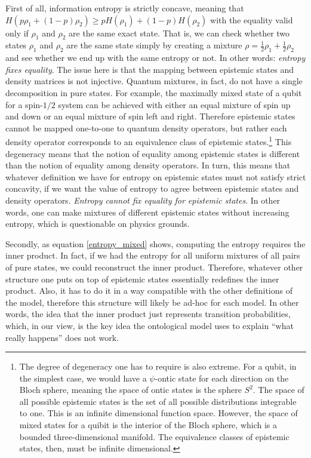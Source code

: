 \documentclass[10pt,twocolumn, nofootinbib]{revtex4-2}
\begin{document}
First of all, information entropy is strictly concave, meaning that $H(p \rho_1 + (1-p) \rho_2) \geq p H(\rho_1) + (1-p) H(\rho_2)$ with the equality valid only if $\rho_1$ and $\rho_2$ are the same exact state. That is, we can check whether two states $\rho_1$ and $\rho_2$ are the same state simply by creating a mixture $\rho = \frac{1}{2} \rho_1 + \frac{1}{2} \rho_2$ and see whether we end up with the same entropy or not. In other words: \emph{entropy fixes equality}. %
The issue here is that the mapping between epistemic states and density matrices is not injective. Quantum mixtures, in fact, do not have a single decomposition in pure states. For example, the maximally mixed state of a qubit for a spin-$1/2$ system can be achieved with either an equal mixture of spin up and down or an equal mixture of spin left and right. Therefore epistemic states cannot be mapped one-to-one to quantum density operators, but rather each density operator corresponds to an equivalence class of epistemic states.\footnote{The degree of degeneracy one has to require is also extreme. For a qubit, in the simplest case, we would have a $\psi$-ontic state for each direction on the Bloch sphere, meaning the space of ontic states is the sphere $S^2$. The space of all possible epistemic states is the set of all possible distributions integrable to one. This is an infinite dimensional function space. However, the space of mixed states for a quibit is the interior of the Bloch sphere, which is a bounded three-dimensional manifold. The equivalence classes of epistemic states, then, must be infinite dimensional.} This degeneracy means that the notion of equality among epistemic states is different than the notion of equality among density operators. In turn, this means that whatever definition we have for entropy on epistemic states must not satisfy strict concavity, if we want the value of entropy to agree between epistemic states and density operators. \emph{Entropy cannot fix equality for epistemic states}. In other words, one can make mixtures of different epistemic states without increasing entropy, which is questionable on physics grounds.

Secondly, as equation \ref{entropy_mixed} shows, computing the entropy requires the inner product. In fact, if we had the entropy for all uniform mixtures of all pairs of pure states, we could reconstruct the inner product. Therefore, whatever other structure one puts on top of epistemic states essentially redefines the inner product. Also, it has to do it in a way compatible with the other definitions of the model, therefore this structure will likely be ad-hoc for each model. In other words, the idea that the inner product just represents transition probabilities, which, in our view, is the key idea the ontological model uses to explain ``what really happens'' does not work.
\end{document}
